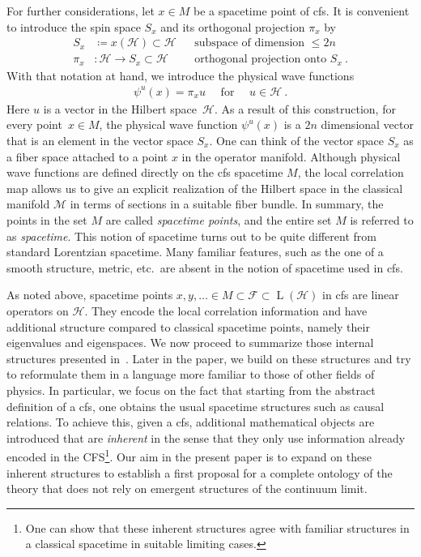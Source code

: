 \documentclass[reqno,11pt]{amsart}
\DeclareMathOperator{\Lin}{L}
\newcommand{\defeq}{\coloneqq}
\renewcommand{\H}{\mathcal{H}}
\newcommand{\F}{{\mathcal{F}}}
\numberwithin{equation}{section}
\begin{document}
For further considerations, let $x \in M$ be a spacetime point of \ac{cfs}.
It is convenient to introduce the spin space $S_x$ and its orthogonal projection $\pi_x$ by
\begin{align*}
    S_{x} &\defeq x(\H) \subset \H && \text{subspace of dimension $\leq 2n$} \\
    \pi_{x} &: \H \rightarrow S_{x}\subset \H && \text{orthogonal projection onto $S_{x}$} \:.
\end{align*}
With that notation at hand, we introduce the physical wave functions
\begin{align*}
    \psi^u(x) = \pi_{x} u \quad \text{ for } \quad u \in \H \:.
\end{align*}
Here $u$ is a vector in the Hilbert space~$\H$.
As a result of this construction, for every point~$x \in M$,
the physical wave function $\psi^u(x)$ is a $2n$ dimensional vector that is an element in the vector space $S_{x}$.
One can think of the vector space $S_{x}$ as a fiber space attached to a point $x$ in the operator manifold.
Although physical wave functions are defined directly on the \ac{cfs} spacetime $M$, the local correlation map allows us
to give an explicit realization of the Hilbert space in the classical manifold $\mathcal{M}$ in terms of sections in a suitable fiber bundle.
In summary, the points in the set $M$ are called \textit{spacetime points}, and the entire set $M$ is referred to as \textit{spacetime}.
This notion of spacetime turns out to be quite different from standard Lorentzian spacetime.
Many familiar features, such as the one of a smooth structure, metric, etc.~are absent in the notion of spacetime used in \ac{cfs}.

As noted above, spacetime points $x, y, \dots \in M \subset \F \subset \Lin(\H)$ in \ac{cfs} are linear operators
on $\H$.
They encode the local correlation information and have additional structure compared to classical spacetime points, namely
their eigenvalues and eigenspaces.
We now proceed to summarize those internal structures presented in~\cite{cfs}.
Later in the paper, we build on these structures and try to reformulate them in a language more familiar to those of other fields of physics.
In particular, we focus on the fact that starting from the abstract definition of a \ac{cfs}, one obtains the usual
spacetime structures such as causal relations.
To achieve this, given a \ac{cfs},
additional mathematical objects are introduced that are \textit{inherent} in the sense that they
only use information already encoded in the CFS\footnote{
    One can show that these inherent structures agree with familiar structures in a classical spacetime in suitable limiting cases.
}.
Our aim in the present paper is to expand on these inherent structures to establish a first proposal for a complete ontology of the theory that
does not rely on emergent structures of the continuum limit.
\end{document}
